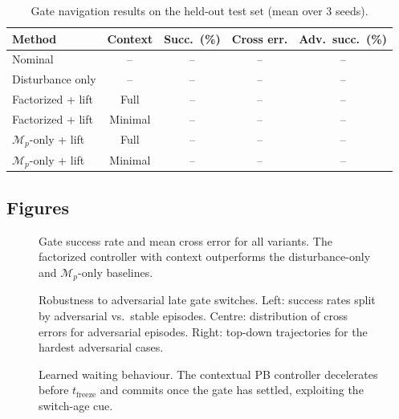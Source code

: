 \documentclass[journal,twoside,web]{ieeecolor}
\begin{document}
\begin{table}[t]
\centering
\caption{Gate navigation results on the held-out test set (mean over 3 seeds).}
\label{tab:gate-results}
\begin{tabular}{lcccc}
\hline
\textbf{Method} & \textbf{Context} & \textbf{Succ.\ (\%)} & \textbf{Cross err.} & \textbf{Adv.\ succ.\ (\%)} \\
\hline
Nominal            & --      & -- & -- & -- \\
Disturbance only   & --      & -- & -- & -- \\
Factorized + lift  & Full    & -- & -- & -- \\
Factorized + lift  & Minimal & -- & -- & -- \\
\(\mathcal{M}_p\)-only + lift & Full    & -- & -- & -- \\
\(\mathcal{M}_p\)-only + lift & Minimal & -- & -- & -- \\
\hline
\end{tabular}
\end{table}

\subsection{Figures}
\label{subsec:gate-figs}

\begin{figure}[t]
\centering
{}
\caption{Gate success rate and mean cross error for all variants. The factorized controller with
context outperforms the disturbance-only and \(\mathcal{M}_p\)-only baselines.}
\label{fig:gate_summary}
\end{figure}

\begin{figure}[t]
\centering
{}
\caption{Robustness to adversarial late gate switches. Left: success rates split by adversarial
vs.\ stable episodes. Centre: distribution of cross errors for adversarial episodes. Right:
top-down trajectories for the hardest adversarial cases.}
\label{fig:gate_adversarial}
\end{figure}

\begin{figure}[t]
\centering
{}
\caption{Learned waiting behaviour. The contextual PB controller decelerates before
\(t_{\mathrm{freeze}}\) and commits once the gate has settled, exploiting the switch-age cue.}
\label{fig:gate_waiting}
\end{figure}
\end{document}
